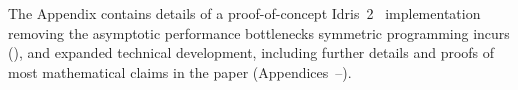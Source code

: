 The Appendix contains details of a proof-of-concept
Idris~2~\cite{DBLP:conf/ecoop/Brady21} implementation removing the
asymptotic performance bottlenecks symmetric programming incurs
(), and expanded technical development,
including further details and proofs of most mathematical claims in
the paper (Appendices~--).
